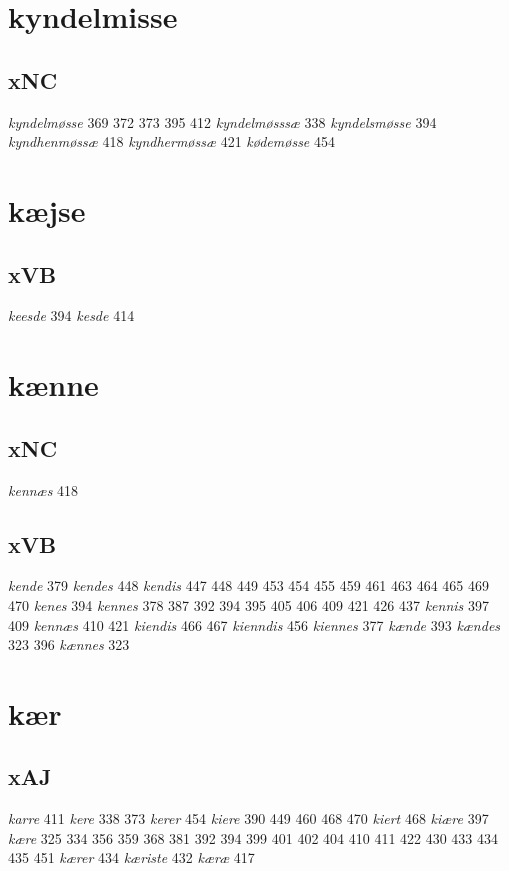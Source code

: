 \documentclass[a4paper,twocolumn]{article}
\begin{document}
\section{kyndelmisse}
\label{sec:org414422e}
\subsection{xNC}
\label{sec:orgd023750}
\emph{kyndelmøsse} 369 372 373 395 412 \emph{kyndelmøsssæ} 338 \emph{kyndelsmøsse} 394 \emph{kyndhenmøssæ} 418 \emph{kyndhermøssæ} 421 \emph{kødemøsse} 454 
\section{kæjse}
\label{sec:orgdc66c0c}
\subsection{xVB}
\label{sec:org5822f36}
\emph{keesde} 394 \emph{kesde} 414 
\section{kænne}
\label{sec:org2451eb1}
\subsection{xNC}
\label{sec:org31302e0}
\emph{kennæs} 418 
\subsection{xVB}
\label{sec:org0c8ad6d}
\emph{kende} 379 \emph{kendes} 448 \emph{kendis} 447 448 449 453 454 455 459 461 463 464 465 469 470 \emph{kenes} 394 \emph{kennes} 378 387 392 394 395 405 406 409 421 426 437 \emph{kennis} 397 409 \emph{kennæs} 410 421 \emph{kiendis} 466 467 \emph{kienndis} 456 \emph{kiennes} 377 \emph{kænde} 393 \emph{kændes} 323 396 \emph{kænnes} 323 
\section{kær}
\label{sec:org3f8885e}
\subsection{xAJ}
\label{sec:org755c149}
\emph{karre} 411 \emph{kere} 338 373 \emph{kerer} 454 \emph{kiere} 390 449 460 468 470 \emph{kiert} 468 \emph{kiære} 397 \emph{kære} 325 334 356 359 368 381 392 394 399 401 402 404 410 411 422 430 433 434 435 451 \emph{kærer} 434 \emph{kæriste} 432 \emph{kæræ} 417 
\end{document}
